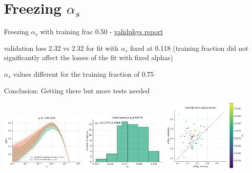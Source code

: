 \documentclass[aspectratio=169,10pt]{beamer}
\begin{document}
\section*{Freezing $\alpha_s$}

\begin{frame}[t]{Freezing $\alpha_s$ with training frac 0.50 - \underline{\href{https://vp.nnpdf.science/J-wRSP3IRxeAMYoImWktBQ==/}{validphys report}}}

  validation loss 2.32 vs 2.32 for fit with $\alpha_s$ fixed at 0.118 (training fraction did not significantly affect the losses of the fit with fixed alphas)\\\vspace*{1em}

  $\alpha_s$ values different for the training fraction of 0.75\\\vspace*{1em}

  Conclusion: Getting there but more tests needed

  \includegraphics[width=0.32\textwidth]{PDFnormalize0_Basespecs0_PDFscalespecs0_plot_pdfs_g_frac50.pdf}  
  \includegraphics[width=0.32\textwidth]{alphas_hist_frac50.pdf}
  \includegraphics[width=0.32\textwidth]{plot_training_validation_frac50.pdf}

\end{frame}



% 
\end{document}
